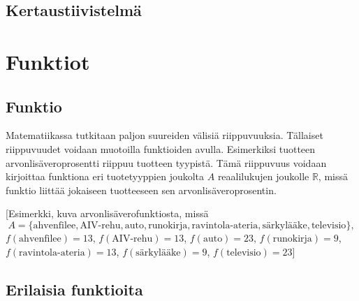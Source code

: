 \chapter{Kertaustiivistelmä}

\part{Funktiot}
\chapter{Funktio}
Matematiikassa tutkitaan paljon suureiden välisiä riippuvuuksia. Tällaiset riippuvuudet voidaan muotoilla funktioiden avulla. Esimerkiksi tuotteen arvonlisäveroprosentti riippuu tuotteen tyypistä. Tämä riippuvuus voidaan kirjoittaa funktiona eri tuotetyyppien joukolta $A$ reaalilukujen joukolle $\mathbb{R}$, missä funktio liittää jokaiseen tuotteeseen sen arvonlisäveroprosentin.

[Esimerkki, kuva arvonlisäverofunktiosta, missä \[A = \{\text{ahvenfilee}, \text{AIV-rehu}, \text{auto}, \text{runokirja}, \text{ravintola-ateria}, \text{särkylääke}, \text{televisio}\},\]$f(\text{ahvenfilee}) = 13$, $f(\text{AIV-rehu}) = 13$, $f(\text{auto}) = 23$, $f(\text{runokirja}) = 9$, $f(\text{ravintola-ateria}) = 13$, $f(\text{särkylääke}) = 9$, $f(\text{televisio}) = 23$]




\chapter{Erilaisia funktioita}
